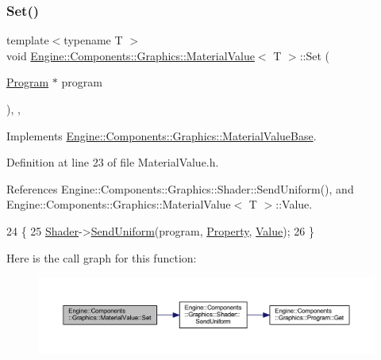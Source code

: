 \subsubsection{\texorpdfstring{Set()}{Set()}}
{\footnotesize\ttfamily template$<$typename T $>$ \\
void \mbox{\hyperlink{classEngine_1_1Components_1_1Graphics_1_1MaterialValue}{Engine\+::\+Components\+::\+Graphics\+::\+Material\+Value}}$<$ T $>$\+::Set (\begin{DoxyParamCaption}\item[{\mbox{\hyperlink{classEngine_1_1Components_1_1Graphics_1_1Program}{Program}} $\ast$}]{program }\end{DoxyParamCaption})\hspace{0.3cm}{\ttfamily [inline]}, {\ttfamily [override]}, {\ttfamily [virtual]}}



Implements \mbox{\hyperlink{classEngine_1_1Components_1_1Graphics_1_1MaterialValueBase_abc2e449e9067701c927fca5962391afb}{Engine\+::\+Components\+::\+Graphics\+::\+Material\+Value\+Base}}.



Definition at line 23 of file Material\+Value.\+h.



References Engine\+::\+Components\+::\+Graphics\+::\+Shader\+::\+Send\+Uniform(), and Engine\+::\+Components\+::\+Graphics\+::\+Material\+Value$<$ T $>$\+::\+Value.


\begin{DoxyCode}
24                 \{
25                     \mbox{\hyperlink{classEngine_1_1Components_1_1Graphics_1_1MaterialValueBase_a45fd55d67557a2975f1274aa41045512}{Shader}}->\mbox{\hyperlink{classEngine_1_1Components_1_1Graphics_1_1Shader_a24131f3622fe536794de21e0fb499276}{SendUniform}}(program, \mbox{\hyperlink{classProperty}{Property}}, 
      \mbox{\hyperlink{classEngine_1_1Components_1_1Graphics_1_1MaterialValue_a1fbe4d2c3c1cf6c1538cf0012a78cb6e}{Value}});
26                 \}
\end{DoxyCode}
Here is the call graph for this function\+:
\nopagebreak
\begin{figure}[H]
\begin{center}
\leavevmode
\includegraphics[width=350pt]{classEngine_1_1Components_1_1Graphics_1_1MaterialValue_a88dbac3446bf9e78c7411e79c1b58977_cgraph}
\end{center}
\end{figure}



